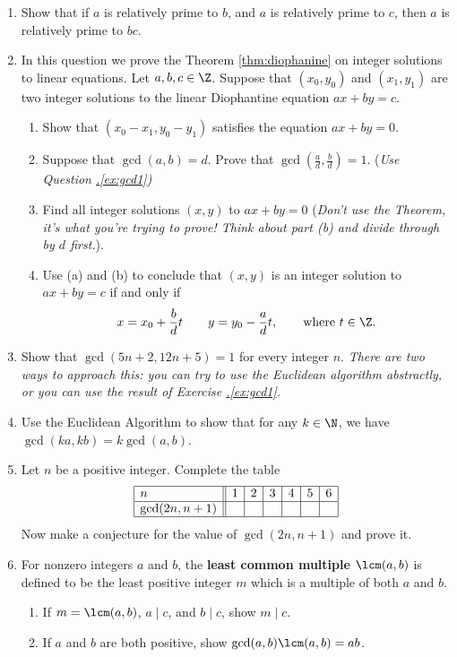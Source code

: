 \begin{enumerate}
    \item Show that if $a$ is relatively prime to $b$, and $a$ is relatively prime to $c$, then $a$ is relatively prime to $bc$.
  
  
  \item In this question we prove the Theorem \ref{thm:diophanine} on integer solutions to linear equations. Let $a,b,c\in\Z$. Suppose that $(x_0,y_0)$ and $(x_1,y_1)$ are two integer solutions to the linear Diophantine equation $ax+by=c$.
  \begin{enumerate}
    \item Show that $(x_0-x_1,y_0-y_1)$ satisfies the equation $ax+by=0$.
    \item Suppose that $\gcd(a,b)=d$. Prove that $\gcd(\frac ad,\frac bd)=1$. (\emph{Use Question \hyperref[ex:gcd1]{\thesubsection.\ref*{ex:gcd1}})}
    \item Find all integer solutions $(x,y)$ to $ax+by=0$ (\emph{Don't use the Theorem, it's what you're trying to prove! Think about part (b) and divide through by $d$ first.}).
    \item Use (a) and (b) to conclude that $(x,y)$ is an integer solution to $ax+by=c$ if and only if
    \[x=x_0+\frac bdt\qquad y=y_0-\frac adt,\qquad \text{where }t\in\Z.\]
  \end{enumerate}
  
  \item Show that $\gcd(5n+2,12n+5)=1$ for every integer $n$. \emph{There are two ways to approach this: you can try to use the Euclidean algorithm abstractly, or you can use the result of Exercise \hyperref[ex:gcd1]{\thesubsection.\ref*{ex:gcd1}}.}
  
  \item Use the Euclidean Algorithm to show that for any $k \in \N$, we have $\gcd(ka,kb) = k \gcd(a,b)$.
  
  \item Let $n$ be a positive integer. Complete the table
  \[\begin{array}{|l||c|c|c|c|c|c|}
  \hline
  n&1&2&3&4&5&6\\\hline
  \gcd(2n,n+1)&&&&&&\\\hline
  \end{array}\]
  Now make a conjecture for the value of $\gcd(2n,n+1)$ and prove it.
  
    \item For nonzero integers $a$ and $b$, the \textbf{least common multiple} $\lcm(a,b)$ is defined to be the least positive integer $m$ which is a multiple of both $a$ and $b$.
    \begin{enumerate}
        \item If $m = \lcm(a,b)$, $a \mid c$, and $b \mid c$, show $m \mid c$.
        \item If $a$ and  $b$ are both positive, show $\gcd(a,b) \lcm(a,b) = ab$.
    \end{enumerate}
  

\end{enumerate}

